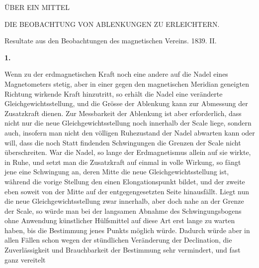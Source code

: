 \clearpage
{}
\begin{center}
{\large ÜBER EIN MITTEL\par\medskip DIE BEOBACHTUNG VON ABLENKUNGEN ZU ERLEICHTERN.}
\par\medskip
Resultate aus den Beobachtungen des magnetischen Vereins. 1839. II.
\end{center}
\par\medskip{}\centerline{\textbf{1.}}\nobreak\smallskip
Wenn zu der erdmagnetischen Kraft noch eine andere auf die Nadel eines Magnetometers stetig, aber in einer gegen den magnetischen Meridian geneigten Richtung wirkende Kraft hinzutritt, so erhält die Nadel eine veränderte Gleichgewichtsstellung, und die Grösse der Ablenkung kann zur Abmessung der Zusatzkraft dienen. Zur Messbarkeit der Ablenkung ist aber erforderlich, dass nicht nur die neue Gleichgewichtsstellung noch innerhalb der Scale liege, sondern auch, insofern man nicht den völligen Ruhezustand der Nadel abwarten kann oder will, dass die noch Statt findenden Schwingungen die Grenzen der Scale nicht überschreiten. War die Nadel, so lange der Erdmagnetismus allein auf sie wirkte, in Ruhe, und setzt man die Zusatzkraft auf einmal in volle Wirkung, so fängt jene eine Schwingung an, deren Mitte die neue Gleichgewichtsstellung ist, während die vorige Stellung den einen Elongationspunkt bildet, und der zweite eben soweit von der Mitte auf der entgegengesetzten Seite hinausfällt. Liegt nun die neue Gleichgewichtsstellung zwar innerhalb, aber doch nahe an der Grenze der Scale, so würde man bei der langsamen Abnahme des Schwingungsbogens ohne Anwendung künstlicher Hülfsmittel auf diese Art erst lange zu warten haben, bis die Bestimmung jenes Punkts möglich würde. Dadurch würde aber in allen Fällen schon wegen der stündlichen Veränderung der Declination, die Zuverlässigkeit und Brauchbarkeit der Bestimmung sehr vermindert, und fast ganz vereitelt
